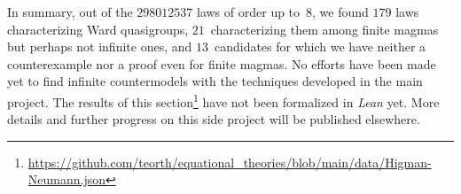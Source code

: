 In summary, out of the $\num{298012537}$ laws of order up to~$8$, we found $179$ laws characterizing Ward quasigroups, $21$~characterizing them among finite magmas but perhaps not infinite ones, and $13$~candidates for which we have neither a counterexample nor a proof even for finite magmas. No efforts have been made yet to find infinite countermodels with the techniques developed in the main project. The results of this section\footnote{\url{https://github.com/teorth/equational_theories/blob/main/data/Higman-Neumann.json}} have not been formalized in \emph{Lean} yet. More details and further progress on this side project will be published elsewhere.
